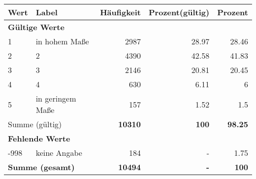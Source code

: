      \begin{longtable}{lXrrr}
     \toprule
     \textbf{Wert} & \textbf{Label} & \textbf{Häufigkeit} & \textbf{Prozent(gültig)} & \textbf{Prozent} \\
     \endhead
     \midrule
     \multicolumn{5}{l}{\textbf{Gültige Werte}}\\

     1 &
     \multicolumn{1}{X}{ in hohem Maße   } &


       \num{2987} &
       \num[round-mode=places,round-precision=2]{28,97} &
         \num[round-mode=places,round-precision=2]{28,46} \\

     2 &
     \multicolumn{1}{X}{ 2   } &


       \num{4390} &
       \num[round-mode=places,round-precision=2]{42,58} &
         \num[round-mode=places,round-precision=2]{41,83} \\

     3 &
     \multicolumn{1}{X}{ 3   } &


       \num{2146} &
       \num[round-mode=places,round-precision=2]{20,81} &
         \num[round-mode=places,round-precision=2]{20,45} \\

     4 &
     \multicolumn{1}{X}{ 4   } &


       \num{630} &
       \num[round-mode=places,round-precision=2]{6,11} &
         \num[round-mode=places,round-precision=2]{6} \\

     5 &
     \multicolumn{1}{X}{ in geringem Maße   } &


       \num{157} &
       \num[round-mode=places,round-precision=2]{1,52} &
         \num[round-mode=places,round-precision=2]{1,5} \\
     \midrule
     \multicolumn{2}{l}{Summe (gültig)} &
       \textbf{\num{10310}} &
     \textbf{100} &
       \textbf{\num[round-mode=places,round-precision=2]{98,25}} \\
     \multicolumn{5}{l}{\textbf{Fehlende Werte}}\\
       -998 &
       keine Angabe &
         \num{184} &
        - &
         \num[round-mode=places,round-precision=2]{1,75} \\
     \midrule
     \multicolumn{2}{l}{\textbf{Summe (gesamt)}} &
          \textbf{\num{10494}} &
        \textbf{-} &
        \textbf{100} \\
     \bottomrule
     \end{longtable}
     
